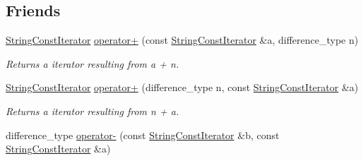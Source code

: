 \subsection*{Friends}
\begin{DoxyCompactItemize}
\item 
\hyperlink{struct_mdt_1_1_plain_text_1_1_string_const_iterator}{String\+Const\+Iterator} \hyperlink{struct_mdt_1_1_plain_text_1_1_string_const_iterator_aa6f9bb8b739cc2e480b3832e51f2311b}{operator+} (const \hyperlink{struct_mdt_1_1_plain_text_1_1_string_const_iterator}{String\+Const\+Iterator} \&a, difference\+\_\+type n)\hypertarget{struct_mdt_1_1_plain_text_1_1_string_const_iterator_aa6f9bb8b739cc2e480b3832e51f2311b}{}\label{struct_mdt_1_1_plain_text_1_1_string_const_iterator_aa6f9bb8b739cc2e480b3832e51f2311b}

\begin{DoxyCompactList}\small\item\em Returns a iterator resulting from {\itshape a} + {\itshape n}. \end{DoxyCompactList}\item 
\hyperlink{struct_mdt_1_1_plain_text_1_1_string_const_iterator}{String\+Const\+Iterator} \hyperlink{struct_mdt_1_1_plain_text_1_1_string_const_iterator_abeed2837c5315658a676d9761bfd5f56}{operator+} (difference\+\_\+type n, const \hyperlink{struct_mdt_1_1_plain_text_1_1_string_const_iterator}{String\+Const\+Iterator} \&a)\hypertarget{struct_mdt_1_1_plain_text_1_1_string_const_iterator_abeed2837c5315658a676d9761bfd5f56}{}\label{struct_mdt_1_1_plain_text_1_1_string_const_iterator_abeed2837c5315658a676d9761bfd5f56}

\begin{DoxyCompactList}\small\item\em Returns a iterator resulting from {\itshape n} + {\itshape a}. \end{DoxyCompactList}\item 
difference\+\_\+type \hyperlink{struct_mdt_1_1_plain_text_1_1_string_const_iterator_a2b48d08e991c1a53e135d72a92ba9519}{operator-\/} (const \hyperlink{struct_mdt_1_1_plain_text_1_1_string_const_iterator}{String\+Const\+Iterator} \&b, const \hyperlink{struct_mdt_1_1_plain_text_1_1_string_const_iterator}{String\+Const\+Iterator} \&a)\hypertarget{struct_mdt_1_1_plain_text_1_1_string_const_iterator_a2b48d08e991c1a53e135d72a92ba9519}{}\label{struct_mdt_1_1_plain_text_1_1_string_const_iterator_a2b48d08e991c1a53e135d72a92ba9519}


\end{DoxyCompactItemize}

